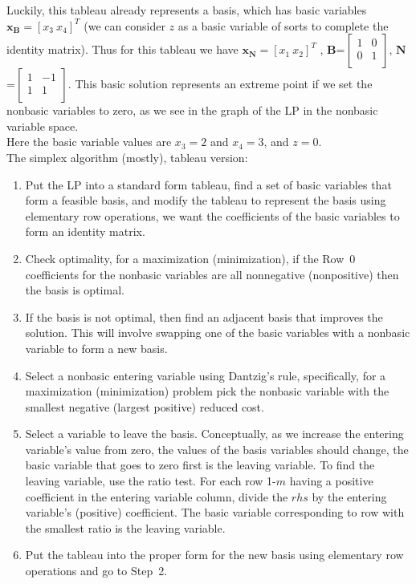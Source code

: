Luckily, this tableau already represents a basis, which has basic variables $\mathbf{x_B}=[x_3~x_4]^T$ (we can consider $z$ as a basic variable of sorts to complete the identity matrix).  Thus for this tableau we have $\mathbf{x_N}=[x_1~ x_2]^T$ ,
$\mathbf{B}$=$\left[ \begin{array}{rr} 1 & 0  \\  0 &  1 \\ \end{array} \right]$, 
$\mathbf{N}$=$\left[ \begin{array}{rr} 1 &-1  \\  1 &  1  \\ \end{array} \right]$.  This basic solution represents an extreme point if we set the nonbasic variables to zero, as we see in the graph of the LP in the nonbasic variable space. \\   

Here the basic variable values are $x_3 = 2$ and $x_4=3$, and $z = 0$. \\

The simplex algorithm (mostly), tableau version:
\begin{enumerate}
\item Put the LP into a standard form tableau, find a set of basic variables that form a feasible basis, and  modify the tableau to represent the basis using elementary row operations, we want the coefficients of the basic variables to form an identity matrix. 
\item Check optimality, for a maximization (minimization), if the Row~0 coefficients for the nonbasic variables are all nonnegative (nonpositive) then the basis is optimal. 
\item If the basis is not optimal, then find an adjacent basis that improves the solution. This will involve swapping one of the basic variables with a nonbasic variable to form a new basis. 
\item Select a nonbasic entering variable using Dantzig’s rule, specifically, for a maximization (minimization) problem pick the nonbasic variable with the smallest negative (largest positive) reduced cost. 
\item Select a variable to leave the basis.  Conceptually, as we increase the entering variable's value from zero, the values of the basis variables should change, the basic variable that goes to zero first is the leaving variable. To find the leaving variable, use the  ratio test.  For each row 1-$m$ having a positive coefficient in the entering variable column, divide the $rhs$ by the entering variable's (positive) coefficient. The basic variable corresponding to row with the smallest ratio is the leaving variable.  
\item Put the  tableau into the proper form for the new basis using elementary row operations and go to Step~2.
\end{enumerate}

